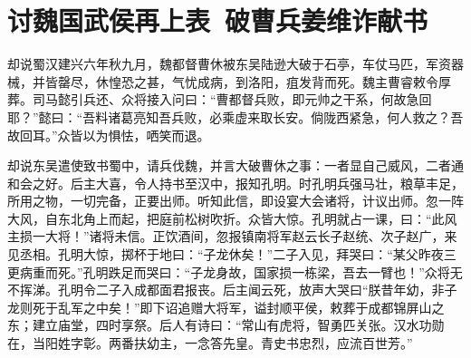 \chapter{讨魏国武侯再上表~破曹兵姜维诈献书}

却说蜀汉建兴六年秋九月，魏都督曹休被东吴陆逊大破于石亭，车仗马匹，军资器械，并皆罄尽，休惶恐之甚，气忧成病，到洛阳，疽发背而死。魏主曹睿敕令厚葬。司马懿引兵还、众将接入问曰：“曹都督兵败，即元帅之干系，何故急回耶？”懿曰：“吾料诸葛亮知吾兵败，必乘虚来取长安。倘陇西紧急，何人救之？吾故回耳。”众皆以为惧怯，哂笑而退。

却说东吴遣使致书蜀中，请兵伐魏，并言大破曹休之事：一者显自己威风，二者通和会之好。后主大喜，令人持书至汉中，报知孔明。时孔明兵强马壮，粮草丰足，所用之物，一切完备，正要出师。听知此信，即设宴大会诸将，计议出师。忽一阵大风，自东北角上而起，把庭前松树吹折。众皆大惊。孔明就占一课，曰：“此风主损一大将！”诸将未信。正饮酒间，忽报镇南将军赵云长子赵统、次子赵广，来见丞相。孔明大惊，掷杯于地曰：“子龙休矣！”二子入见，拜哭曰：“某父昨夜三更病重而死。”孔明跌足而哭曰：“子龙身故，国家损一栋梁，吾去一臂也！”众将无不挥涕。孔明令二子入成都面君报丧。后主闻云死，放声大哭曰“朕昔年幼，非子龙则死于乱军之中矣！”即下诏追赠大将军，谥封顺平侯，敕葬于成都锦屏山之东；建立庙堂，四时享祭。后人有诗曰：“常山有虎将，智勇匹关张。汉水功勋在，当阳姓字彰。两番扶幼主，一念答先皇。青史书忠烈，应流百世芳。”

